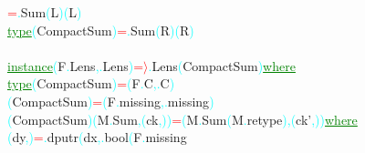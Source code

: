 \textcolor{red}{=}\textcolor{cyan}{.}{\rm{}Sum}\hsspace \textcolor{cyan}{(}{\rm{}L}\textcolor{cyan}{)}\hsspace \textcolor{cyan}{(}{\rm{}L}\textcolor{cyan}{)}\\\hstab \textcolor{green}{\underline{type}}\hsspace \textcolor{cyan}{(}{\rm{}CompactSum}\textcolor{cyan}{)}\hsspace \textcolor{red}{=}\textcolor{cyan}{.}{\rm{}Sum}\hsspace \textcolor{cyan}{(}{\rm{}R}\textcolor{cyan}{)}\hsspace \textcolor{cyan}{(}{\rm{}R}\textcolor{cyan}{)}\\\\\textcolor{green}{\underline{instance}}\hsspace \textcolor{cyan}{(}{\rm{}F}\textcolor{cyan}{.}{\rm{}Lens}\textcolor{cyan}{,}\textcolor{cyan}{.}{\rm{}Lens}\textcolor{cyan}{)}\hsspace \textcolor{red}{=\ensuremath{\rangle}}\textcolor{cyan}{.}{\rm{}Lens}\hsspace \textcolor{cyan}{(}{\rm{}CompactSum}\textcolor{cyan}{)}\hsspace \textcolor{green}{\underline{where}}\\\hstab \textcolor{green}{\underline{type}}\hsspace \hsspace \textcolor{cyan}{(}{\rm{}CompactSum}\textcolor{cyan}{)}\hsspace \textcolor{red}{=}\hsspace \textcolor{cyan}{(}{\rm{}F}\textcolor{cyan}{.}{\rm{}C}\textcolor{cyan}{,}\textcolor{cyan}{.}{\rm{}C}\textcolor{cyan}{)}\\\hsspace \textcolor{cyan}{(}{\rm{}CompactSum}\textcolor{cyan}{)}\hsspace \textcolor{red}{=}\hsspace \textcolor{cyan}{(}{\rm{}F}\textcolor{cyan}{.}{\rm{}missing}\textcolor{cyan}{,}\textcolor{cyan}{.}{\rm{}missing}\textcolor{cyan}{)}\\\hsspace \textcolor{cyan}{(}{\rm{}CompactSum}\textcolor{cyan}{)}\hsspace \textcolor{cyan}{(}{\rm{}M}\textcolor{cyan}{.}{\rm{}Sum}\textcolor{cyan}{,}\hsspace \textcolor{cyan}{(}{\rm{}ck}\textcolor{cyan}{,}\textcolor{cyan}{)}\textcolor{cyan}{)}\hsspace \textcolor{red}{=}\hsspace \textcolor{cyan}{(}{\rm{}M}\textcolor{cyan}{.}{\rm{}Sum}\hsspace \textcolor{cyan}{(}{\rm{}M}\textcolor{cyan}{.}{\rm{}retype}\textcolor{cyan}{)}\textcolor{cyan}{,}\hsspace \textcolor{cyan}{(}{\rm{}ck'}\textcolor{cyan}{,}\textcolor{cyan}{)}\textcolor{cyan}{)}\hsspace \textcolor{green}{\underline{where}}\\\hstab \hstab \textcolor{cyan}{(}{\rm{}dy}\textcolor{cyan}{,}\textcolor{cyan}{)}\hsspace \textcolor{red}{=}\textcolor{cyan}{.}{\rm{}dputr}\hsspace \textcolor{cyan}{(}{\rm{}dx}\textcolor{cyan}{,}\textcolor{cyan}{.}{\rm{}bool}\hsspace \textcolor{cyan}{(}{\rm{}F}\textcolor{cyan}{.}{\rm{}missing}\hsspace 